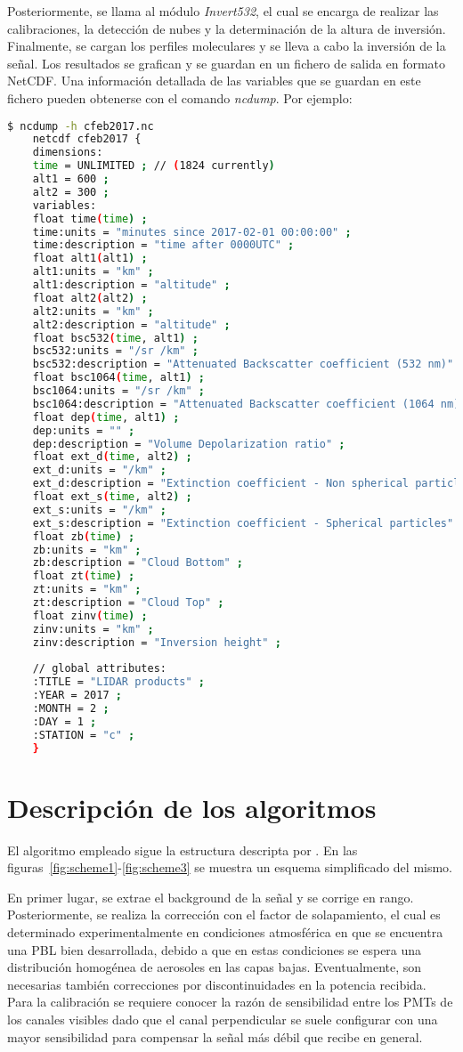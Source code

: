 \documentclass[12pt,a4paper,final]{report}
\begin{document}
	Posteriormente, se llama al módulo \emph{Invert532}, el cual se encarga de realizar las calibraciones, la detección de nubes y la determinación de la altura de inversión. Finalmente, se cargan los perfiles moleculares y se lleva a cabo la inversión de la señal. Los resultados se grafican y se guardan en un fichero de salida en formato NetCDF. Una información detallada de las variables que se guardan en este fichero pueden obtenerse con el comando \emph{ncdump}. Por ejemplo:
	\begin{lstlisting}[basicstyle=\footnotesize, language=bash]
	$ ncdump -h cfeb2017.nc 
	netcdf cfeb2017 {
	dimensions:
	time = UNLIMITED ; // (1824 currently)
	alt1 = 600 ;
	alt2 = 300 ;
	variables:
	float time(time) ;
	time:units = "minutes since 2017-02-01 00:00:00" ;
	time:description = "time after 0000UTC" ;
	float alt1(alt1) ;
	alt1:units = "km" ;
	alt1:description = "altitude" ;
	float alt2(alt2) ;
	alt2:units = "km" ;
	alt2:description = "altitude" ;
	float bsc532(time, alt1) ;
	bsc532:units = "/sr /km" ;
	bsc532:description = "Attenuated Backscatter coefficient (532 nm)" ;
	float bsc1064(time, alt1) ;
	bsc1064:units = "/sr /km" ;
	bsc1064:description = "Attenuated Backscatter coefficient (1064 nm)" ;
	float dep(time, alt1) ;
	dep:units = "" ;
	dep:description = "Volume Depolarization ratio" ;
	float ext_d(time, alt2) ;
	ext_d:units = "/km" ;
	ext_d:description = "Extinction coefficient - Non spherical particles" ;
	float ext_s(time, alt2) ;
	ext_s:units = "/km" ;
	ext_s:description = "Extinction coefficient - Spherical particles" ;
	float zb(time) ;
	zb:units = "km" ;
	zb:description = "Cloud Bottom" ;
	float zt(time) ;
	zt:units = "km" ;
	zt:description = "Cloud Top" ;
	float zinv(time) ;
	zinv:units = "km" ;
	zinv:description = "Inversion height" ;
	
	// global attributes:
	:TITLE = "LIDAR products" ;
	:YEAR = 2017 ;
	:MONTH = 2 ;
	:DAY = 1 ;
	:STATION = "c" ;
	}
	\end{lstlisting}
	
	\chapter{Descripción de los algoritmos}
	El algoritmo empleado sigue la estructura descripta por \citet{shimizu2017}. En las figuras~\ref{fig:scheme1}-\ref{fig:scheme3} se muestra un esquema simplificado del mismo.
	
	En primer lugar, se extrae el background de la señal y se corrige en rango. Posteriormente, se realiza la corrección con el factor de solapamiento, el cual es determinado experimentalmente en condiciones atmosférica en que se encuentra una PBL bien desarrollada, debido a que en estas condiciones se espera una distribución homogénea de aerosoles en las capas bajas. Eventualmente, son necesarias también correcciones por discontinuidades en la potencia recibida. Para la calibración se requiere conocer la razón de sensibilidad entre los PMTs de los canales visibles dado que el canal perpendicular se suele configurar con una mayor sensibilidad  para compensar la señal más débil que recibe en general. 
	
\end{document}
